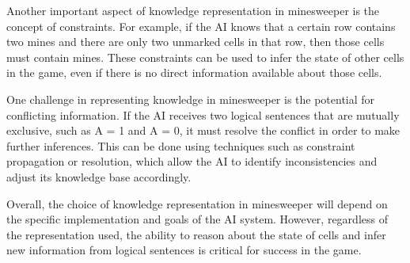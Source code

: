 \documentclass{article} %
\begin{document}
Another important aspect of knowledge representation in minesweeper is the concept of constraints. For example, if the AI knows that a certain row contains two mines and there are only two unmarked cells in that row, then those cells must contain mines. These constraints can be used to infer the state of other cells in the game, even if there is no direct information available about those cells.

One challenge in representing knowledge in minesweeper is the potential for conflicting information. If the AI receives two logical sentences that are mutually exclusive, such as {A} = 1 and {A} = 0, it must resolve the conflict in order to make further inferences. This can be done using techniques such as constraint propagation or resolution, which allow the AI to identify inconsistencies and adjust its knowledge base accordingly.

Overall, the choice of knowledge representation in minesweeper will depend on the specific implementation and goals of the AI system. However, regardless of the representation used, the ability to reason about the state of cells and infer new information from logical sentences is critical for success in the game.
\end{document}
